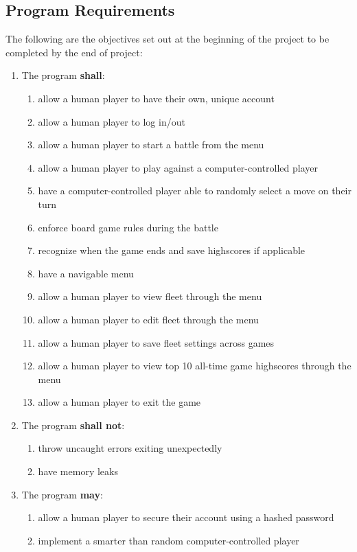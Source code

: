 \documentclass[11pt]{article} %
\begin{document}
\subsection{Program Requirements}
The following are the objectives set out at the beginning of the project to be completed by the end of project:
\begin{enumerate}[label=\Roman*.]
  \item The program \textbf{shall}:
  \begin{enumerate}[label=\arabic*.]
    \item allow a human player to have their own, unique account
    \item allow a human player to log in/out
    \item allow a human player to start a battle from the menu
    \item allow a human player to play against a computer-controlled player
    \item have a computer-controlled player able to randomly select a move on their turn
    \item enforce board game rules during the battle
    \item recognize when the game ends and save highscores if applicable
    \item have a navigable menu
    \item allow a human player to view fleet through the menu
    \item allow a human player to edit fleet through the menu
    \item allow a human player to save fleet settings across games
    \item allow a human player to view top 10 all-time game highscores through the menu
    \item allow a human player to exit the game
  \end{enumerate}
  \item The program \textbf{shall not}:
  \begin{enumerate}[label=\arabic*.,resume]
    \item throw uncaught errors exiting unexpectedly
    \item have memory leaks
  \end{enumerate}
  \item The program \textbf{may}:
  \begin{enumerate}[label=\arabic*.,resume]
    \item allow a human player to secure their account using a hashed password
    \item implement a smarter than random computer-controlled player
  \end{enumerate}
\end{enumerate}
\end{document}
